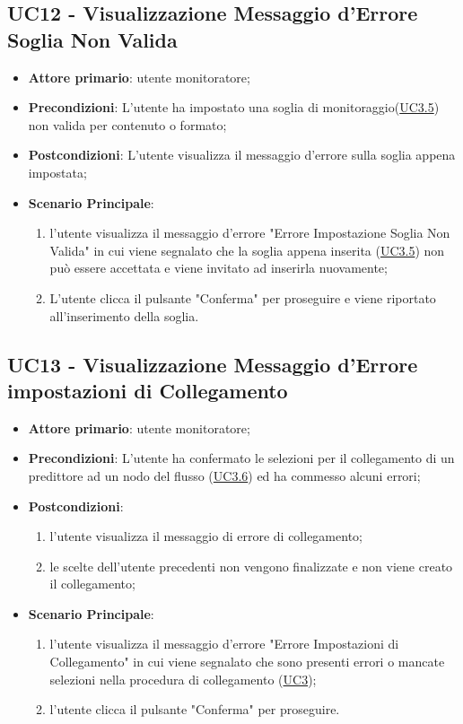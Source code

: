 
		\label{par:UC12}
	\subsection{UC12 - Visualizzazione Messaggio d'Errore Soglia Non Valida}
		\begin{itemize}
			\item\textbf{Attore primario}: utente monitoratore;
			\item\textbf{Precondizioni}: L’utente ha impostato una soglia di monitoraggio(\hyperref[par:UC3.5]{UC3.5}) non valida per contenuto o formato;
			\item\textbf{Postcondizioni}: L’utente visualizza il messaggio d'errore sulla soglia appena impostata;		
			\item\textbf{Scenario Principale}: 
				\begin{enumerate} 
					\item l’utente visualizza il messaggio d'errore "Errore Impostazione Soglia Non Valida" in cui viene segnalato che la soglia appena inserita (\hyperref[par:UC3.5]{UC3.5}) non può essere accettata e viene invitato ad inserirla nuovamente;
					\item L'utente clicca il pulsante "Conferma" per proseguire e viene riportato all'inserimento della soglia.		
				\end{enumerate}		
		\end{itemize}


	\label{par:UC13}
	\subsection{UC13 - Visualizzazione Messaggio d'Errore impostazioni di Collegamento}
		\begin{itemize}
			\item\textbf{Attore primario}: utente monitoratore;
			\item\textbf{Precondizioni}: L’utente ha confermato le selezioni per il collegamento di un predittore ad un nodo del flusso (\hyperref[par:UC3.6]{UC3.6}) ed ha commesso alcuni errori;
			\item\textbf{Postcondizioni}: 
				\begin{enumerate}
					\item l’utente visualizza il messaggio di errore di collegamento;
					\item le scelte dell'utente precedenti non vengono finalizzate e non viene creato il collegamento; 
				\end{enumerate}		
			\item\textbf{Scenario Principale}: 
				\begin{enumerate} 
					\item l’utente visualizza il messaggio d'errore "Errore Impostazioni di Collegamento" in cui viene segnalato che sono presenti errori o mancate selezioni nella procedura di collegamento (\hyperref[par:UC3]{UC3});
					\item l'utente clicca il pulsante "Conferma" per proseguire.		
				\end{enumerate}		
		\end{itemize}

